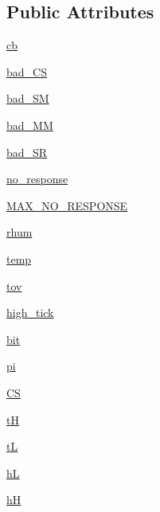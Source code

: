 \subsection*{Public Attributes}
\begin{DoxyCompactItemize}
\item 
\hyperlink{classconcretesensor_1_1dht22Temperature_1_1DHT22Temperature_af0ee196f57bbfea47363511f11ea8c89}{cb}
\item 
\hyperlink{classconcretesensor_1_1dht22Temperature_1_1DHT22Temperature_a5954e7e6a7f46bd25fddd4dfb61d6698}{bad\+\_\+\+C\+S}
\item 
\hyperlink{classconcretesensor_1_1dht22Temperature_1_1DHT22Temperature_ab83fa4c0ca8db3392093c1b4256b8d94}{bad\+\_\+\+S\+M}
\item 
\hyperlink{classconcretesensor_1_1dht22Temperature_1_1DHT22Temperature_a156cd3080407942c0d693c2a06cd8d76}{bad\+\_\+\+M\+M}
\item 
\hyperlink{classconcretesensor_1_1dht22Temperature_1_1DHT22Temperature_abfdb96486686f8006a34c53de8baeee6}{bad\+\_\+\+S\+R}
\item 
\hyperlink{classconcretesensor_1_1dht22Temperature_1_1DHT22Temperature_ac350567c202730ea2766ccc47f68101e}{no\+\_\+response}
\item 
\hyperlink{classconcretesensor_1_1dht22Temperature_1_1DHT22Temperature_a80a42ce2bc3de268950abdc652195eb6}{M\+A\+X\+\_\+\+N\+O\+\_\+\+R\+E\+S\+P\+O\+N\+S\+E}
\item 
\hyperlink{classconcretesensor_1_1dht22Temperature_1_1DHT22Temperature_ae58e52c807c8dc9f4e1817858d2f676b}{rhum}
\item 
\hyperlink{classconcretesensor_1_1dht22Temperature_1_1DHT22Temperature_ac544f71072788a928b1b7dc2f9835f8b}{temp}
\item 
\hyperlink{classconcretesensor_1_1dht22Temperature_1_1DHT22Temperature_a7c1c5aa9a51ae54c4d8c873e50a9e4ea}{tov}
\item 
\hyperlink{classconcretesensor_1_1dht22Temperature_1_1DHT22Temperature_a4e348ad7b2d9d617562171d4faed23e5}{high\+\_\+tick}
\item 
\hyperlink{classconcretesensor_1_1dht22Temperature_1_1DHT22Temperature_addb42590c1227bd2a8a4efaf980c25ed}{bit}
\item 
\hyperlink{classconcretesensor_1_1dht22Temperature_1_1DHT22Temperature_a4c166a285b53225fe8bc69d2a17a5913}{pi}
\item 
\hyperlink{classconcretesensor_1_1dht22Temperature_1_1DHT22Temperature_aa11fe0373f50db5774e17600a1a3dc4f}{C\+S}
\item 
\hyperlink{classconcretesensor_1_1dht22Temperature_1_1DHT22Temperature_aa55bd6a4f28f6baaef7afe632e19c431}{t\+H}
\item 
\hyperlink{classconcretesensor_1_1dht22Temperature_1_1DHT22Temperature_aad0e5336dadfb0b8fd59d11fa537e2ce}{t\+L}
\item 
\hyperlink{classconcretesensor_1_1dht22Temperature_1_1DHT22Temperature_ac6f81385b7c9660ceed35ab25eff8cc0}{h\+L}
\item 
\hyperlink{classconcretesensor_1_1dht22Temperature_1_1DHT22Temperature_a4398e1c90e3a88ec45325b75ee5f09d8}{h\+H}
\end{DoxyCompactItemize}
